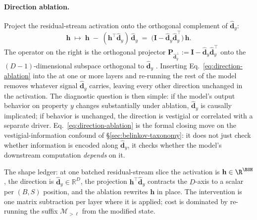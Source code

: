 \paragraph{Direction ablation.} Project the residual-stream activation
onto the orthogonal complement of $\hat{\mathbf{d}}_y$:
\begin{equation}
  \boxed{\;
  \mathbf{h} \;\mapsto\;
  \mathbf{h} \;-\; (\mathbf{h}^\top \hat{\mathbf{d}}_y)\,\hat{\mathbf{d}}_y
  \;=\; \big(\mathbf{I} - \hat{\mathbf{d}}_y \hat{\mathbf{d}}_y^\top\big)\,\mathbf{h}.
  \;}
  \label{eq:direction-ablation}
\end{equation}
The operator on the right is the orthogonal projector
$\mathbf{P}_{\hat{\mathbf{d}}_y^{\perp}} :=
\mathbf{I} - \hat{\mathbf{d}}_y \hat{\mathbf{d}}_y^{\top}$ onto the
$(D-1)$-dimensional subspace orthogonal to $\hat{\mathbf{d}}_y$
\citep{marks-tegmark-2023-truth}. Inserting Eq.~\eqref{eq:direction-ablation}
into the  at one or more layers and re-running the rest
of the model removes whatever signal $\hat{\mathbf{d}}_y$ carries,
leaving every other direction unchanged in the activation. The
diagnostic question is then simple: if the model's output behavior on
property $y$ changes substantially under ablation, $\hat{\mathbf{d}}_y$
is causally implicated; if behavior is unchanged, the direction is
vestigial or correlated with a separate driver. Eq.~\eqref{eq:direction-ablation}
is the formal closing move on the vestigial-information confound of
\S\ref{sec:belinkov-taxonomy}: it does not just check whether
information is encoded along $\hat{\mathbf{d}}_y$, it checks whether
the model's downstream computation \emph{depends} on it.

The shape ledger: at one batched residual-stream slice the activation
is $\mathbf{h} \in \R^{\BSH}$, the
direction is $\hat{\mathbf{d}}_y \in \mathbb{R}^D$, the projection
$\mathbf{h}^\top \hat{\mathbf{d}}_y$ contracts the $D$-axis to a
scalar per $(B, S)$ position, and the ablation rewrites $\mathbf{h}$
in place. The intervention is one matrix subtraction per layer where
it is applied; cost is dominated by re-running the suffix
$\mathcal{M}_{>\ell}$ from the modified state.


